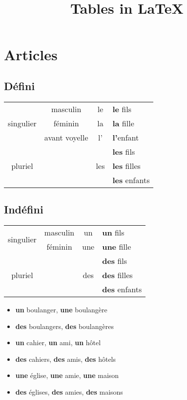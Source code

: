 \documentclass[12pt]{article}  %
\begin{document}
 

\newcommand{\bo}[1]{\textbf{#1}}

\title{\LARGE Tables in \LaTeX }

\section{Articles} 

\subsection{Défini}

\begin{tabular}{| c | c | c | l |}
  \hline                       
  \multirow{3}{*}{singulier} 
  	& masculin      & le & \bo{le} fils  \\ \cline{2-4}
  	& féminin       & la & \bo{la} fille \\ \cline{2-4}
  	& avant voyelle & l' & \bo{l'}enfant \\ \hline
  \multirow{3}{*}{pluriel} 
  	& & \multirow{3}{*}{les} & \bo{les} fils \\ \cline{4-4}
    & &  & \bo{les} filles \\ \cline{4-4}
    & &  & \bo{les} enfants \\
  \hline  
\end{tabular}

\subsection{Indéfini}

\begin{tabular}{| c | c | c | l |}
  \hline                       
  \multirow{2}{*}{singulier} 
  	& masculin      & un & \bo{un} fils  \\ \cline{2-4}
  	& féminin       & une & \bo{une} fille \\ \cline{2-4}
  \multirow{3}{*}{pluriel} 
  	& & \multirow{3}{*}{des} & \bo{des} fils \\ \cline{4-4}
    & &  & \bo{des} filles \\ \cline{4-4}
    & &  & \bo{des} enfants \\
  \hline  
\end{tabular}

\begin{itemize}
  \item \bo{un} boulanger, \bo{une} boulangère 
  \item \bo{des} boulangers, \bo{des} boulangères
  \item \bo{un} cahier, \bo{un} ami, \bo{un} hôtel
  \item \bo{des} cahiers, \bo{des} amis, \bo{des} hôtels
  \item \bo{une} église, \bo{une} amie, \bo{une} maison
  \item \bo{des} églises, \bo{des} amies, \bo{des} maisons
\end{itemize}
\end{document}

